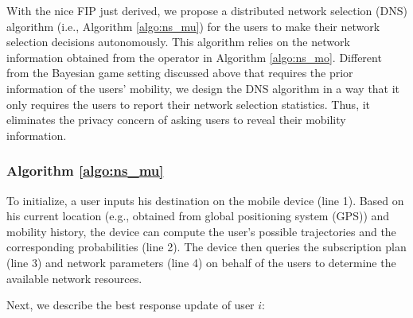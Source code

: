 \documentclass[journal]{IEEEtran}
\begin{document}
  With the nice FIP just derived, we propose a distributed network selection (DNS) algorithm (i.e., Algorithm \ref{algo:ns_mu}) for the users to make their network selection decisions autonomously.
	This algorithm relies on the network information obtained from the operator in Algorithm \ref{algo:ns_mo}.
	Different from the Bayesian game setting discussed above that requires the prior information of the users' mobility, we design the DNS algorithm in a way that it only requires the users to report their network selection statistics. Thus, it eliminates the privacy concern of asking users to reveal their mobility information. %



	

\subsubsection{Algorithm \ref{algo:ns_mu}}	
	
	To initialize, a user inputs his destination on the mobile device (line 1). Based on his current location (e.g., obtained from global positioning system (GPS)) and mobility history, the device can compute the user's possible trajectories and the corresponding probabilities (line 2). The device then queries the subscription plan (line 3) and network parameters (line 4) on behalf of the users to determine the available network resources. 
	
	Next, we describe the best response update of user $i$:



\end{document}
